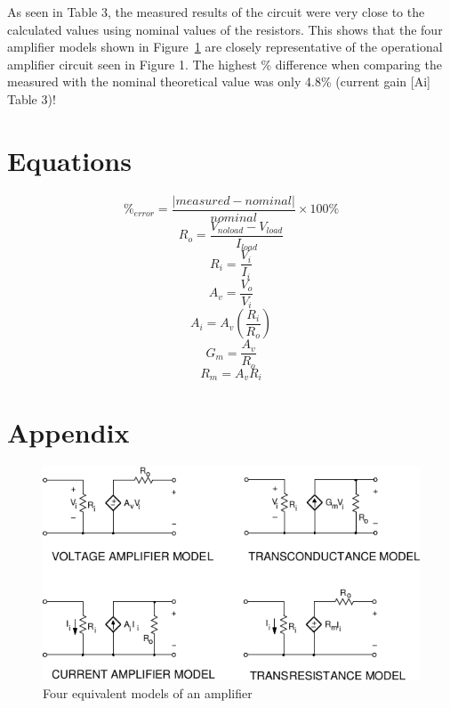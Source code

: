 \documentclass{article}
\begin{document}
As seen in Table 3, the measured results of the circuit were very
close to the calculated values using nominal values of the resistors.
This shows that the four amplifier models shown in
Figure~\ref{fig:amp_models} are closely representative of the
operational amplifier circuit seen in Figure 1.  The highest \%
difference when comparing the measured with the nominal theoretical
value was only 4.8\% (current gain [Ai] Table 3)!

\section*{Equations}

\begin{equation}
  \label{eqn:percent_error}
  \%_{error} = \frac{|measured - nominal|}{nominal} \times 100\%
\end{equation}
%
\begin{equation}
  \label{eqn:R_o}
  R_o = \frac{V_{noload} - V_{load}}{I_{load}}
\end{equation}
%
\begin{equation}
  \label{eqn:R_i}
  R_i = \frac{V_i}{I_i}
\end{equation}
%
\begin{equation}
  \label{eqn:A_v}
  A_v = \frac{V_o}{V_i}
\end{equation}
%
\begin{equation}
  \label{eqn:A_i}
  A_i = A_v \left(\frac{R_i}{R_o}\right)
\end{equation}
%
\begin{equation}
  \label{eqn:G_m}
  G_m = \frac{A_v}{R_o}
\end{equation}
%
\begin{equation}
  \label{eqn:R_m}
  R_m = A_v R_i
\end{equation}

\section{Appendix}
\label{sec:appendix}

\begin{figure}[h]
  \centering
  \includegraphics[]{img/amp_models}
  \caption{Four equivalent models of an amplifier}
  \label{fig:amp_models}
\end{figure}
\end{document}
